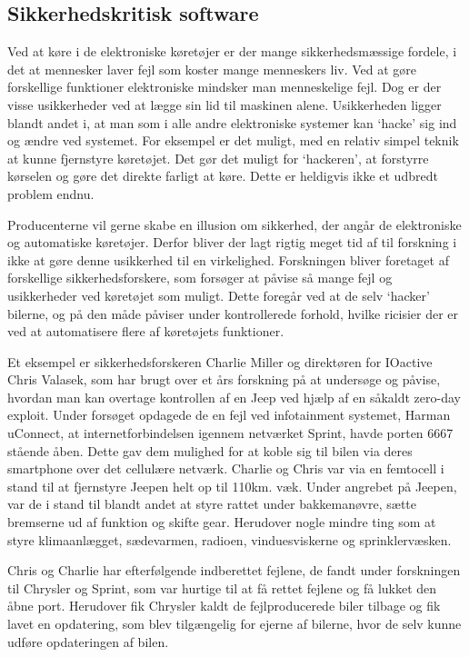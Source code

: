 \subsection{Sikkerhedskritisk software}
Ved at køre i de elektroniske køretøjer er der mange sikkerhedsmæssige fordele, i det at mennesker laver fejl som koster mange menneskers liv. Ved at gøre forskellige funktioner elektroniske mindsker man menneskelige fejl. Dog er der visse usikkerheder ved at lægge sin lid til maskinen alene. Usikkerheden ligger blandt andet i, at man som i alle andre elektroniske systemer kan `hacke' sig ind og ændre ved systemet. For eksempel er det muligt, med en relativ simpel teknik at kunne fjernstyre køretøjet. Det gør det muligt for `hackeren', at forstyrre kørselen og gøre det direkte farligt at køre. Dette er heldigvis ikke et udbredt problem endnu.  

Producenterne vil gerne skabe en illusion om sikkerhed, der angår de elektroniske og automatiske køretøjer. Derfor bliver der lagt rigtig meget tid af til forskning i ikke at gøre denne usikkerhed til en virkelighed. Forskningen bliver foretaget af forskellige sikkerhedsforskere, som forsøger at påvise så mange fejl og usikkerheder ved køretøjet som muligt. Dette foregår ved at de selv `hacker' bilerne, og på den måde påviser under kontrollerede forhold, hvilke ricisier der er ved at automatisere flere af køretøjets funktioner.\cite{Jeep1}

Et eksempel er sikkerhedsforskeren Charlie Miller og direktøren for IOactive Chris Valasek, som har brugt over et års forskning på at undersøge og påvise, hvordan man kan overtage kontrollen af en Jeep ved hjælp af en såkaldt zero-day exploit. Under forsøget opdagede de en fejl ved infotainment systemet, Harman uConnect, at internetforbindelsen igennem netværket Sprint, havde porten 6667 stående åben. Dette gav dem mulighed for at koble sig til bilen via deres smartphone over det cellulære netværk. Charlie og Chris var via en femtocell i stand til at fjernstyre Jeepen helt op til 110km. væk. Under angrebet på Jeepen, var de i stand til blandt andet at styre rattet under bakkemanøvre, sætte bremserne ud af funktion og skifte gear. Herudover nogle mindre ting som at styre klimaanlægget, sædevarmen, radioen, vinduesviskerne og sprinklervæsken. \cite{Jeep1}\cite{Jeep2}

Chris og Charlie har efterfølgende indberettet fejlene, de fandt under forskningen til Chrysler og Sprint, som var hurtige til at få rettet fejlene og få lukket den åbne port. Herudover fik Chrysler kaldt de fejlproducerede biler tilbage og fik lavet en opdatering, som blev tilgængelig for ejerne af bilerne, hvor de selv kunne udføre opdateringen af bilen. \cite{Jeep1}   



